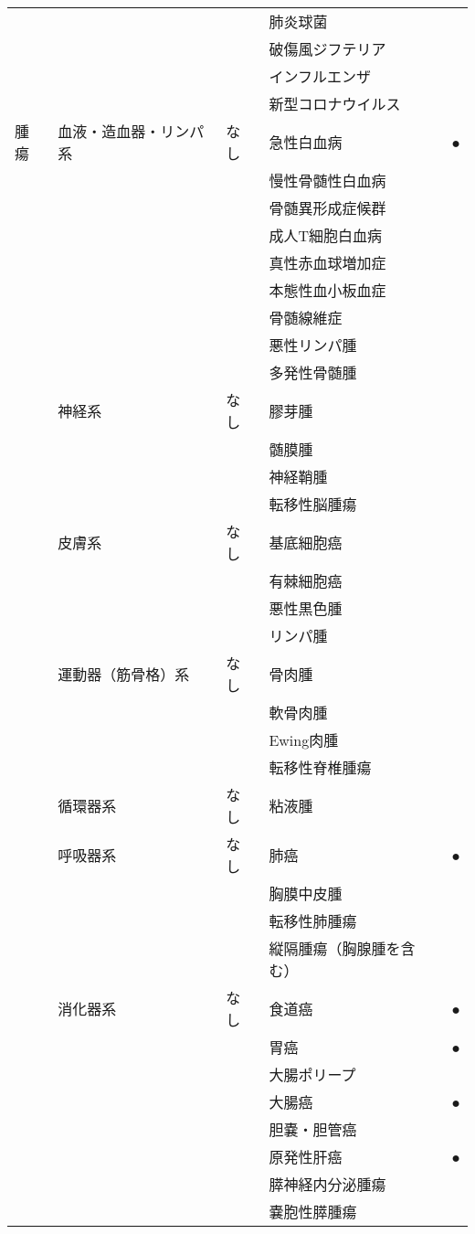 \begin{xltabular}{\linewidth}{XXXXX}
 &  &  & 肺炎球菌 &  \\
 &  &  & 破傷風ジフテリア &  \\
 &  &  & インフルエンザ &  \\
 &  &  & 新型コロナウイルス &  \\
腫瘍 & 血液・造血器・リンパ系 & なし & 急性白血病 & ● \\
 &  &  & 慢性骨髄性白血病 &  \\
 &  &  & 骨髄異形成症候群 &  \\
 &  &  & 成人T細胞白血病 &  \\
 &  &  & 真性赤血球増加症 &  \\
 &  &  & 本態性血小板血症 &  \\
 &  &  & 骨髄線維症 &  \\
 &  &  & 悪性リンパ腫 &  \\
 &  &  & 多発性骨髄腫 &  \\
 & 神経系 & なし & 膠芽腫 &  \\
 &  &  & 髄膜腫 &  \\
 &  &  & 神経鞘腫 &  \\
 &  &  & 転移性脳腫瘍 &  \\
 & 皮膚系 & なし & 基底細胞癌 &  \\
 &  &  & 有棘細胞癌 &  \\
 &  &  & 悪性黒色腫 &  \\
 &  &  & リンパ腫 &  \\
 & 運動器（筋骨格）系 & なし & 骨肉腫 &  \\
 &  &  & 軟骨肉腫 &  \\
 &  &  & Ewing肉腫 &  \\
 &  &  & 転移性脊椎腫瘍 &  \\
 & 循環器系 & なし & 粘液腫 &  \\
 & 呼吸器系 & なし & 肺癌 & ● \\
 &  &  & 胸膜中皮腫 &  \\
 &  &  & 転移性肺腫瘍 &  \\
 &  &  & 縦隔腫瘍（胸腺腫を含む） &  \\
 & 消化器系 & なし & 食道癌 & ● \\
 &  &  & 胃癌 & ● \\
 &  &  & 大腸ポリープ &  \\
 &  &  & 大腸癌 & ● \\
 &  &  & 胆嚢・胆管癌 &  \\
 &  &  & 原発性肝癌 & ● \\
 &  &  & 膵神経内分泌腫瘍 &  \\
 &  &  & 嚢胞性膵腫瘍 &  \\

\end{xltabular}
